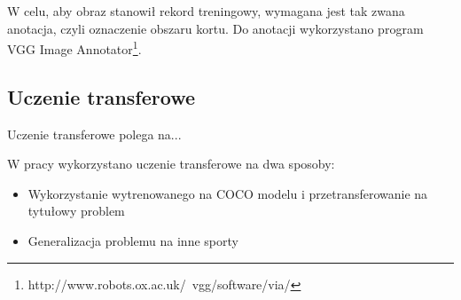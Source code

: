 W celu, aby obraz stanowił rekord treningowy, wymagana jest tak zwana anotacja, czyli oznaczenie obszaru kortu. Do anotacji wykorzystano program VGG Image Annotator\footnote{http://www.robots.ox.ac.uk/~vgg/software/via/}.
\\


\subsection{Uczenie transferowe}

Uczenie transferowe polega na...

W pracy wykorzystano uczenie transferowe na dwa sposoby:

\begin{itemize}
	\item Wykorzystanie wytrenowanego na COCO modelu i przetransferowanie na tytułowy problem
	\item Generalizacja problemu na inne sporty
\end{itemize}

